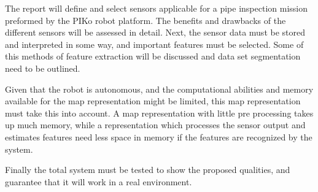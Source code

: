 The report will define and select sensors applicable for a pipe inspection mission
preformed by the PIKo robot platform. The benefits and drawbacks of the different sensors
will be assessed in detail. Next, the sensor data must be stored and interpreted in some
way, and important features must be selected. Some of this methods of feature extraction
will be discussed and data set segmentation need to be outlined. 

Given that the robot is autonomous, and the computational abilities and memory available
for the map representation might be limited, this map representation must take this into
account. A map representation with little pre processing takes up much memory, while a
representation which processes the sensor output and estimates features need less space in
memory if the features are recognized by the system. 

Finally the total system must be tested to show the proposed qualities, and guarantee that
it will work in a real environment. 

